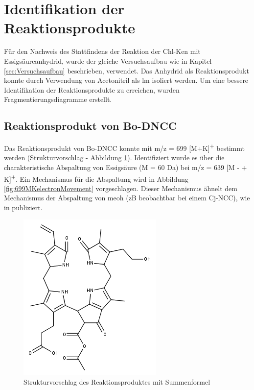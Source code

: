\section{Identifikation der Reaktionsprodukte} \label{sec:RPMSLeafspray}

Für den Nachweis des Stattfindens der Reaktion der \gls{Chl-K}en mit Essigsäureanhydrid, wurde der gleiche Versuchsaufbau wie in Kapitel \ref{sec:Versuchsaufbau} beschrieben, verwendet. Das Anhydrid als Reaktionsprodukt konnte durch Verwendung von Acetonitril als \gls{lm} isoliert werden. Um eine bessere Identifikation der Reaktionsprodukte zu erreichen, wurden Fragmentierungsdiagramme erstellt.  

\subsection{Reaktionsprodukt von Bo-DNCC}

Das Reaktionsprodukt von Bo-DNCC konnte mit m/z = 699 [M+K]\textsuperscript{+} bestimmt werden (Strukturvorschlag - Abbildung \ref{fig:699MKstructure}). Identifiziert wurde es über die charakteristische Abspaltung von Essigsäure (M = 60 Da) bei m/z = 639 [M -  + K]\textsuperscript{+}. Ein Mechanismus für die Abspaltung wird in Abbildung \ref{fig:699MKelectronMovement} vorgeschlagen. Dieser Mechanismus ähnelt dem Mechanismus der Abspaltung von \gls{meoh} (\gls{zB} beobachtbar bei einem Cj-NCC), wie in \cite{StructureElucidation} publiziert.\\

\begin{figure}[!htbp]
  \centering
  \includegraphics[scale=0.6]{figures/Kapitel4/Kataboliten/fragmentation_structures/VWA_Katabolit_699.png}
  \caption[Strukturvorschlag des Reaktionsproduktes von Bo-DNCC, Quelle: Autor]{Strukturvorschlag des Reaktionsproduktes mit Summenformel }
  \label{fig:699MKstructure}
\end{figure}

